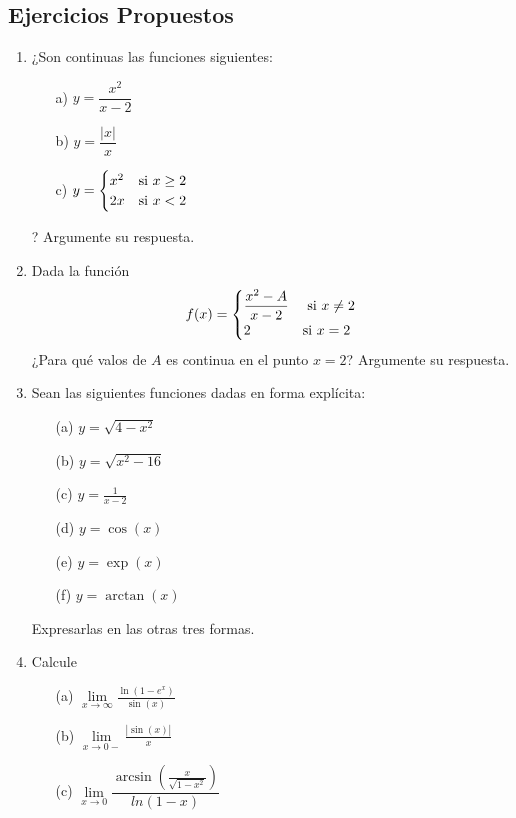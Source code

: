 \documentclass[10pt,twoside]{SelfArx} %
\begin{document}
\subsection{Ejercicios Propuestos}
\begin{enumerate}
	\item	¿Son continuas las funciones siguientes: %
		\begin{enumerate}
			\item[a)] $ y=\dfrac{x^{2}}{x-2} $
			\item[b)] $ y=\dfrac{|x|}{x} $
			\item[c)] $ y=\begin{cases}
			x^{2} & \hbox{si $ x\geq2 $}\\
			2x & \hbox{si $ x<2 $}
			\end{cases} $
		\end{enumerate}
		? Argumente su respuesta.
	\item Dada la función  %
	\[ f(x)=\begin{cases}
	\dfrac{x^{2}-A}{x-2} & \hbox{ si $ x\neq2 $}\\
	2 & \hbox{si $ x=2 $}
	\end{cases}
	 \]
	 ¿Para qué valos de $ A $ es continua en el punto $ x=2 $? Argumente su respuesta.
	\item	Sean las siguientes funciones dadas en forma expl\'icita:	%
		\begin{enumerate}
			\item[(a)]	$ y=\sqrt{4-x^{2}} $
			\item[(b)]	$ y=\sqrt{x^{2}-16} $
			\item[(c)]	$ y=\frac{1}{x-2} $
			\item[(d)]	$ y=\cos(x) $
			\item[(e)]	$ y=\exp(x) $
			\item[(f)]	$ y=\arctan(x) $
		\end{enumerate}
		Expresarlas en las otras tres formas.
	\item	Calcule %
		\begin{enumerate}
			\item[(a)]	$ \lim\limits_{x\rightarrow\infty}\frac{\ln(1-e^{x})}{\sin(x)} $
			\item[(b)]	$ \lim\limits_{x\rightarrow0-}\frac{|\sin(x)|}{x} $
			\item[(c)]	$ \lim\limits_{x\rightarrow0}\dfrac{\arcsin(\frac{x}{\sqrt{1-x^{2}}})}{ln(1-x)} $
			

\end{enumerate}
\end{enumerate}
\end{document}
